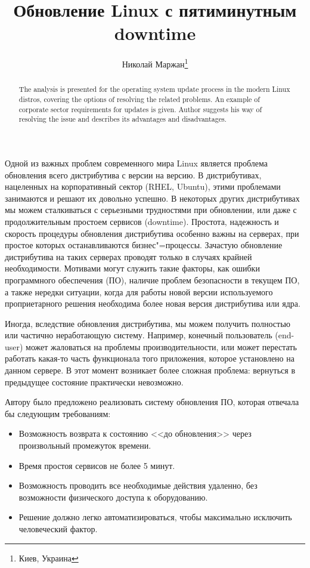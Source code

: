 \documentclass[10pt, a5paper]{article}
\begin{document}
\title{Обновление Linux с пятиминутным downtime}%

\author{Николай Маржан\footnote{Киев, Украина}}
\maketitle

\begin{abstract}
The analysis is presented for the operating system update process in the modern Linux distros, covering the options of resolving the related problems. An example of corporate sector requirements for updates is given. Author suggests his way of resolving the issue and describes its advantages and disadvantages.
\end{abstract}


Одной из важных проблем современного мира Linux является проблема обновления всего дистрибутива с версии на версию. В дистрибутивах, нацеленных на корпоративный сектор (RHEL, Ubuntu), этими проблемами занимаются и решают их довольно успешно. В некоторых других дистрибутивах мы можем сталкиваться с серьезными трудностями при обновлении, или даже с продолжительным простоем сервисов (downtime). Простота, надежность и скорость процедуры обновления дистрибутива особенно \linebreak важны на серверах, при простое которых останавливаются бизнес"=процессы. Зачастую обновление дистрибутива на таких серверах проводят только в случаях крайней необходимости. Мотивами могут служить такие факторы, как ошибки программного обеспечения (ПО), наличие проблем безопасности в текущем ПО, а также нередки ситуации, когда для работы новой версии используемого проприетарного решения необходима более новая версия дистрибутива или ядра.

Иногда, вследствие обновления дистрибутива, мы можем получить полностью или частично неработающую систему. Например, конечный пользователь (end-user) может жаловаться на проблемы производительности, или может перестать работать какая-то часть функционала того приложения, которое установлено на данном сервере. В этот момент возникает более сложная проблема: вернуться в предыдущее состояние практически невозможно.

Автору было предложено реализовать систему обновления ПО, которая отвечала бы следующим требованиям:

\begin{itemize}
  \item Возможность возврата к состоянию <<до обновления>> через произвольный промежуток времени.
  \item Время простоя сервисов не более 5 минут.
  \item Возможность проводить все необходимые действия удаленно, без возможности физического доступа к оборудованию.
  \item Решение должно легко автоматизироваться, чтобы максимально исключить человеческий фактор.
\end{itemize}
\end{document}
